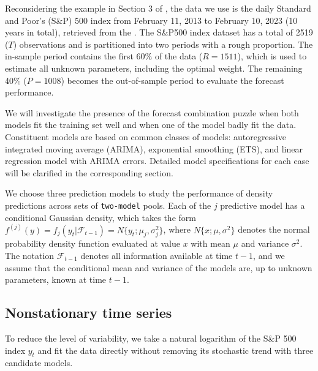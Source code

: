\documentclass{monashthesis}
\begin{document}
Reconsidering the example in Section 3 of \textcite{GA11}, the data we use is the daily Standard and Poor's (S\&P) 500 index from February 11, 2013 to February 10, 2023 (10 years in total), retrieved from the \textcite{SP500}. The S\&P500 index dataset has a total of 2519 (\(T\)) observations and is partitioned into two periods with a rough proportion. The in-sample period contains the first 60\% of the data (\(R = 1511\)), which is used to estimate all unknown parameters, including the optimal weight. The remaining 40\% (\(P = 1008\)) becomes the out-of-sample period to evaluate the forecast performance.

We will investigate the presence of the forecast combination puzzle when both models fit the training set well and when one of the model badly fit the data. Constituent models are based on common classes of models: autoregressive integrated moving average (ARIMA), exponential smoothing (ETS), and linear regression model with ARIMA errors. Detailed model specifications for each case will be clarified in the corresponding section.

We choose three prediction models to study the performance of density predictions across sets of \texttt{two-model} pools. Each of the \(j\) predictive model has a conditional Gaussian density, which takes the form \(f^{(j)}(y)=f_j(y_t|\mathcal{F}_{t-1})=N\{y_t; \mu_j, \sigma^2_j\}\), where \(N\{x; \mu, \sigma^2\}\) denotes the normal probability density function evaluated at value \(x\) with mean \(\mu\) and variance \(\sigma^2\). The notation \(\mathcal{F}_{t-1}\) denotes all information available at time \(t-1\), and we assume that the conditional mean and variance of the models are, up to unknown parameters, known at time \(t-1\).

\hypertarget{nonstationary-time-series}{%
\subsection{Nonstationary time series}\label{nonstationary-time-series}}

To reduce the level of variability, we take a natural logarithm of the S\&P 500 index \(y_t\) and fit the data directly without removing its stochastic trend with three candidate models.
\end{document}
